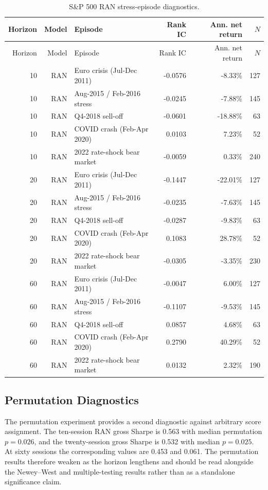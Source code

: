 \documentclass[10pt]{article}
\begin{document}
\begingroup\scriptsize\setlength{\tabcolsep}{3pt}
\begin{longtable}{rrlrrr}
\caption{S\&P 500 RAN stress-episode diagnostics.}\label{tab:sp500stress}\\
\toprule
Horizon & Model & Episode & Rank IC & Ann. net return & $N$\\
\midrule
\endfirsthead
\toprule
Horizon & Model & Episode & Rank IC & Ann. net return & $N$\\
\midrule
\endhead
10 & RAN & Euro crisis (Jul-Dec 2011) & -0.0576 & -8.33\% & 127 \\
10 & RAN & Aug-2015 / Feb-2016 stress & -0.0245 & -7.88\% & 145 \\
10 & RAN & Q4-2018 sell-off & -0.0601 & -18.88\% & 63 \\
10 & RAN & COVID crash (Feb-Apr 2020) & 0.0103 & 7.23\% & 52 \\
10 & RAN & 2022 rate-shock bear market & -0.0059 & 0.33\% & 240 \\
20 & RAN & Euro crisis (Jul-Dec 2011) & -0.1447 & -22.01\% & 127 \\
20 & RAN & Aug-2015 / Feb-2016 stress & -0.0235 & -7.63\% & 145 \\
20 & RAN & Q4-2018 sell-off & -0.0287 & -9.83\% & 63 \\
20 & RAN & COVID crash (Feb-Apr 2020) & 0.1083 & 28.78\% & 52 \\
20 & RAN & 2022 rate-shock bear market & -0.0305 & -3.35\% & 230 \\
60 & RAN & Euro crisis (Jul-Dec 2011) & -0.0047 & 6.00\% & 127 \\
60 & RAN & Aug-2015 / Feb-2016 stress & -0.1107 & -9.53\% & 145 \\
60 & RAN & Q4-2018 sell-off & 0.0857 & 4.68\% & 63 \\
60 & RAN & COVID crash (Feb-Apr 2020) & 0.2790 & 40.29\% & 52 \\
60 & RAN & 2022 rate-shock bear market & 0.0132 & 2.32\% & 190 \\
\bottomrule
\end{longtable}
\endgroup

\subsection{Permutation Diagnostics}

The permutation experiment provides a second diagnostic against arbitrary score assignment. The ten-session RAN gross Sharpe is 0.563 with median permutation $p=0.026$, and the twenty-session gross Sharpe is 0.532 with median $p=0.025$. At sixty sessions the corresponding values are 0.453 and 0.061. The permutation results therefore weaken as the horizon lengthens and should be read alongside the Newey--West and multiple-testing results rather than as a standalone significance claim.
\end{document}
